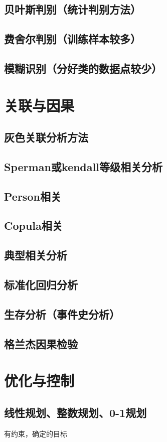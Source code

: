 \documentclass[openany]{progbookcn}
\begin{document}
\section{贝叶斯判别（统计判别方法）}
\section{费舍尔判别（训练样本较多）}
\section{模糊识别（分好类的数据点较少）}
\chapter{关联与因果}
\section{灰色关联分析方法}
\section{Sperman或kendall等级相关分析}
\section{Person相关}
\section{Copula相关}
\section{典型相关分析}
\section{标准化回归分析}
\section{生存分析（事件史分析）}
\section{格兰杰因果检验}
\chapter{优化与控制}
\section{线性规划、整数规划、0-1规划}
有约束，确定的目标
\end{document}
